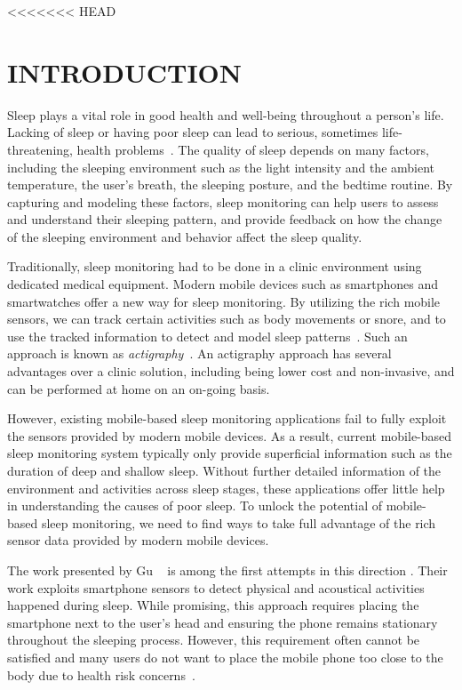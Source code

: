 <<<<<<< HEAD
\section{INTRODUCTION}\label{sec:1introduction}

Sleep plays a vital role in good health and well-being throughout a person's life. Lacking of sleep or having poor sleep can lead to
serious, sometimes life-threatening, health problems~\cite{lallukka2016contribution}. The quality of sleep depends on many factors,
including the sleeping environment such as the light intensity and the ambient temperature, the user's breath, the sleeping posture, and
the bedtime routine. By capturing and modeling these factors, sleep monitoring can help users to assess and understand their sleeping
pattern, and provide feedback on how the change of the sleeping environment and behavior affect the sleep quality.

Traditionally, sleep monitoring had to be done in a clinic environment using dedicated medical equipment.  Modern mobile devices such as
smartphones and smartwatches offer a new way for sleep monitoring. By utilizing the rich mobile sensors, we can track certain activities
such as body movements or snore, and to use the tracked information to detect and model sleep
patterns~\cite{zeo,Jawbone,SleepAndroid,fitbit,gu2016sleep}. Such an approach is known as
\emph{actigraphy}~\cite{Actigraphy,ancoli2003role}. An actigraphy approach has several advantages over a clinic solution, including being
lower cost and non-invasive, and can be performed at home on an on-going basis.


However, existing mobile-based sleep monitoring applications fail to fully exploit the sensors provided by modern mobile devices. As a
result, current mobile-based sleep monitoring system typically only provide superficial information such as the duration of deep and
shallow sleep. Without further detailed information of the environment and activities across sleep stages, these applications offer little
help in understanding the causes of poor sleep. To unlock the potential of mobile-based sleep monitoring, we need to find ways to take full
advantage of the rich sensor data provided by modern mobile devices.


The work presented by Gu \etal~\cite{gu2016sleep} is among the first attempts in this direction
\cite{lawson2013validating,bauer2012shuteye,min2014toss,al2014classifying}. Their work exploits smartphone sensors to detect physical and
acoustical activities happened during sleep. While promising, this approach requires placing the smartphone next to the user's head and
ensuring the phone remains stationary throughout the sleeping process. However, this requirement often cannot be satisfied and many users
do not want to place the mobile phone too close to the body due to health risk concerns~\cite{StepHealth,Quorasleep}.

